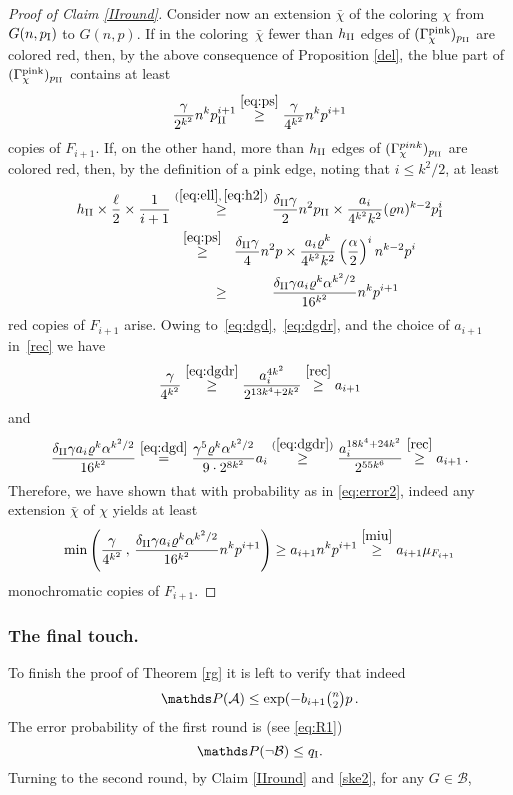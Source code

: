 \documentclass[reqno, 12pt]{amsart}
\newcommand{\PP}{\mathds{P}}
\let\rho=\varrho
\def\PP{\mathds P}
\def\bchi{\bar\chi}
\begin{document}
\begin{proof}[Proof of Claim \ref{IIround}]
Consider now an extension $\bchi$ of the coloring $\chi$ from $G(n,p_{\rm I})$ to $G(n,p)$. If in
the coloring~$\bchi$ fewer than $h_{\rm II}$ edges of $(\Gamma_\chi^{\rm pink})_{p_{\rm II}}$ are
colored red, then, by the above consequence of Proposition \ref{del}, the blue part of
$(\Gamma_\chi^{\rm pink})_{p_{\rm II}}$ contains at least
\[
    \frac{\gamma}{2^{k^2}} n^kp_{\rm II}^{i+1}
    \overset{\eqref{eq:ps}}{\geq}
    \frac{\gamma}{4^{k^2}} n^kp^{i+1}
\]
copies of $F_{i+1}$. If, on the other hand, more than $h_{\rm II}$ edges of
$(\Gamma_\chi^{pink})_{p_{\rm II}}$ are colored red, then, by the definition of a pink edge, noting
that $i\le k^2/2$, at least
\begin{align*}
    h_{\rm II}\times \frac{\ell}{2}\times \frac1{i+1}
    &\overset{(\ref{eq:ell},\,\ref{eq:h2})}{\geq}
    \frac{\delta_{\rm II}\gamma}{2} n^2p_{\rm II}\times \frac{a_i}{4^{k^2}k^2}(\rho n)^{k-2}p_{\rm I}^i\\
    &\overset{\hspace{6pt}\eqref{eq:ps}\hspace{6pt}}{\geq}
    \frac{\delta_{\rm II}\gamma}{4} n^2p\times \frac{a_i\rho^k}{4^{k^2}k^2}\left(\frac\alpha2\right)^in^{k-2}p^i\\
    &\overset{\phantom{(\ref{eq:ell},\,\ref{eq:h2})}}{\geq}
    \frac{\delta_{\rm II}\gamma a_i\rho^k\alpha^{k^2/2}}{16^{k^2}}n^kp^{i+1}
\end{align*}
red copies of $F_{i+1}$ arise. Owing to~\eqref{eq:dgd},~\eqref{eq:dgdr}, and the choice of
$a_{i+1}$ in~\eqref{rec} we have
\[
    \frac{\gamma}{4^{k^2}}
    \overset{\eqref{eq:dgdr}}{\ge}
    \frac{a_i^{4k^2}}{2^{13k^4+2k^2}}
    \overset{\eqref{rec}}{\ge}
    a_{i+1}
\]
and
\[
    \frac{\delta_{\rm II}\gamma a_i\rho^k\alpha^{k^2/2}}{16^{k^2}}
    \overset{\eqref{eq:dgd}}{=}
    \frac{\gamma^5\rho^k\alpha^{k^2/2}}{9\cdot 2^{8k^2}} a_i
    \overset{(\ref{eq:dgdr})}{\ge}
    \frac{a_i^{18k^4+24k^2}}{2^{55k^6}}
    \overset{\eqref{rec}}{\ge}
    a_{i+1}\,.
\]
Therefore, we have shown that with  probability as in \eqref{eq:error2}, indeed any extension
$\bchi$ of $\chi$ yields at least
$$\min\left(\frac{\gamma}{4^{k^2}}\,,\,\frac{\delta_{\rm II}\gamma a_i\rho^k\alpha^{k^2/2}}
{16^{k^2}}n^kp^{i+1}\right)\ge a_{i+1}n^kp^{i+1}\overset{\eqref{miu}}{\ge} a_{i+1}\mu_{F_{i+1}}$$
monochromatic copies of $F_{i+1}$.
\end{proof}

\subsubsection*{The final touch.}
To finish the proof of Theorem \ref{rg} it is left to verify that indeed 
\[
	\PP(\mathcal A)\le\exp(-b_{i+1}\tbinom n2p\,.
\] 
The error probability of the first round is (see \eqref{eq:R1})
$$\PP(\neg\mathcal B)\le q_{\rm I}.$$
Turning to the second round, by Claim \ref{IIround} and \eqref{ske2}, for any $G\in\mathcal B$,
\end{document}
